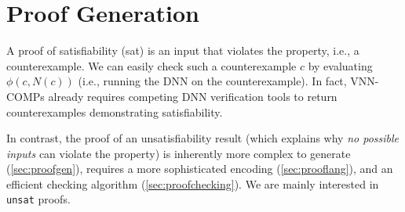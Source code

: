 \documentclass[oneside,11pt,dvipsnames]{book}
\begin{document}
\section{Proof Generation}\label{sec:proofgen}




A proof of satisfiability (sat) is an input that violates the property, i.e., a counterexample.  We can easily  check such a counterexample $c$ by evaluating $\phi(c,N(c))$ (i.e., running the DNN on the counterexample).
In fact, VNN-COMPs already requires competing DNN verification tools to return counterexamples demonstrating satisfiability.  

In contrast, the proof of an unsatisfiability result (which explains why \emph{no possible inputs} can violate the property) is inherently more complex to generate (\autoref{sec:proofgen}), requires a more sophisticated encoding (\autoref{sec:prooflang}), and an efficient checking algorithm (\autoref{sec:proofchecking}). We are mainly interested in \texttt{unsat} proofs.
\end{document}
